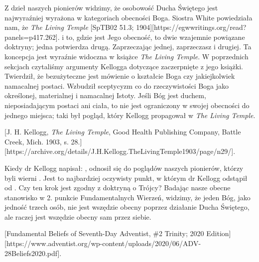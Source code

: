Z dzieł naszych pionierów widzimy, że osobowość Ducha Świętego jest najwyraźniej wyrażona w kategoriach obecności Boga. Siostra White powiedziała nam, że \textit{The Living Temple} [SpTB02 51.3; 1904][https://egwwritings.org/read?panels=p417.262].  i to, gdzie jest Jego obecność, to dwie wzajemnie powiązane doktryny; jedna potwierdza drugą. Zaprzeczając jednej, zaprzeczasz i drugiej. Ta koncepcja jest wyraźnie widoczna w książce \textit{The Living Temple}. W poprzednich sekcjach czytaliśmy argumenty Kellogga dotyczące  zaczerpnięte z jego książki. Twierdził, że bezużyteczne jest mówienie o kształcie Boga czy jakiejkolwiek namacalnej postaci. Wzbudził sceptycyzm co do rzeczywistości Boga jako określonej, materialnej i namacalnej Istoty. Jeśli Bóg jest duchem, nieposiadającym postaci ani ciała, to nie jest ograniczony w swojej obecności do jednego miejsca; taki był pogląd, który Kellogg propagował w \textit{The Living Temple}.

[J. H. Kellogg, \textit{The Living Temple}, Good Health Publishing Company, Battle Creek, Mich. 1903, s. 28.][https://archive.org/details/J.H.Kellogg.TheLivingTemple1903/page/n29/].

Kiedy dr Kellogg napisał: , odnosił się do poglądów naszych pionierów, którzy byli wierni . Jest to najbardziej oczywisty punkt, w którym dr Kellogg odstąpił od . Czy ten krok jest zgodny z doktryną o Trójcy? Badając nasze obecne stanowisko w 2. punkcie Fundamentalnych Wierzeń, widzimy, że jeden Bóg, jako jedność trzech osób, nie jest wszędzie obecny poprzez działanie Ducha Świętego, ale raczej jest wszędzie obecny sam przez siebie.

[Fundamental Beliefs of Seventh-Day Adventist, \#2 Trinity; 2020 Edition][https://www.adventist.org/wp-content/uploads/2020/06/ADV-28Beliefs2020.pdf].

